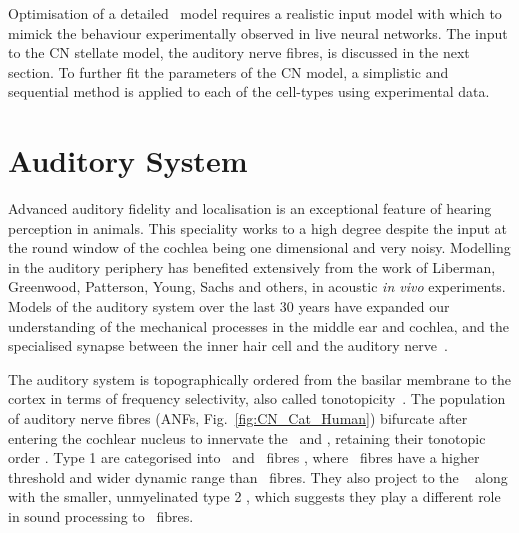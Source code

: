 
Optimisation of a detailed \BNN~model requires a realistic input model with which to mimick the behaviour experimentally observed in live neural networks. The input to the CN stellate model, the auditory nerve fibres, is discussed in the next section. To further fit the parameters of the CN model, a simplistic and sequential method is applied to each of the cell-types using experimental data.


\section{Auditory System    \label{sec:CN:auditory-model}}

Advanced auditory fidelity and localisation is an exceptional feature of hearing perception in animals.
This speciality works to a high degree despite the input at the round window of the cochlea being one dimensional and very noisy.
Modelling in the auditory periphery has benefited extensively from the work of Liberman, Greenwood, Patterson, Young, Sachs and others, in acoustic \textit{in vivo} experiments.
Models of the auditory system over the last 30 years have expanded our understanding of the mechanical processes in the middle ear and cochlea, and the specialised synapse between the inner hair cell and the auditory nerve~\citep{DavisVoigt:1991,Carney:1993,MeddisHewittEtAl:1990}.


The auditory system is topographically ordered from the basilar membrane to the cortex in terms of frequency selectivity, also called tonotopicity~\citep{YoungOertel:2004}.
The population of auditory nerve fibres (ANFs, Fig.~\ref{fig:CN_Cat_Human}) bifurcate after entering the cochlear nucleus to innervate the \VCN~and \DCN, retaining their tonotopic order \citep{Lorente:1981,Liberman:1982,Liberman:1993}.
Type 1 \ANFs are categorised into {\HSR}~and {\LSR}~fibres \citep{Liberman:1978}, where \LSR~fibres have a higher threshold and wider dynamic range than \HSR~fibres.
They also project to the \GCD~\citep{RyugoParks:2003, RyugoHaenggeliEtAl:2003} along with the smaller, unmyelinated type 2 \ANFs, which suggests they play a different role in sound processing to \HSR~fibres.

